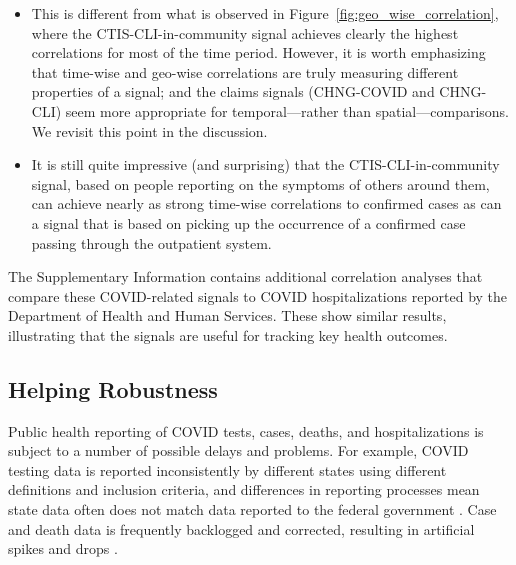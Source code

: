 \documentclass[9pt,twocolumn,twoside,lineno]{pnas-new}
\begin{document}
\begin{itemize}
\item This is different from what is observed in
  Figure~\ref{fig:geo_wise_correlation}, where the CTIS-CLI-in-community signal
  achieves clearly the highest correlations for most of the time period.
  However, it is worth emphasizing that time-wise and geo-wise
  correlations are truly measuring different properties of a signal; and the
  claims signals (CHNG-COVID and CHNG-CLI) seem more appropriate for
  temporal---rather than spatial---comparisons.  We revisit this point in the
  discussion.

\item It is still quite impressive (and surprising) that the
  CTIS-CLI-in-community signal, based on people reporting on the symptoms of
  others around them, can achieve  nearly as strong time-wise correlations to
  confirmed cases as can a signal that is based on picking up the occurrence of
  a confirmed case passing through the outpatient system.
\end{itemize}
The Supplementary Information contains additional correlation analyses that
compare these COVID-related signals to COVID hospitalizations reported by the
Department of Health and Human Services. These show similar results,
illustrating that the signals are useful for tracking key health outcomes.

\subsection{Helping Robustness}

Public health reporting of COVID tests, cases, deaths, and hospitalizations is
subject to a number of possible delays and problems. For example, COVID testing
data is reported inconsistently by different states using different definitions
and inclusion criteria, and differences in reporting processes mean state data
often does not match data reported to the federal government
\cite{Schechtman:2021}. Case and death data is frequently backlogged and
corrected, resulting in artificial spikes and drops \cite{Simon:2021,
  ArvisaisAnhalt:2021}.
\end{document}
